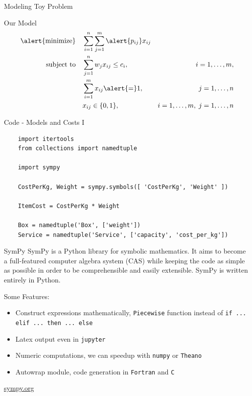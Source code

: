 \documentclass[10pt,utf8,presentation]{beamer}
\begin{document}
\begin{frame}{Modeling Toy Problem}

\begin{block}{Our Model}
  \begin{equation*}
    \begin{aligned}
      \text{\alert{minimize}} & \quad \sum_{i=1}^{n} \sum_{j=1}^{m} \alert{p_{ij}} x_{ij} \\
      \text{subject to} & \quad \sum_{j=1}^{n} w_j x_{ij} \leq c_i, & i=1, \ldots, m, \\
      & \quad \sum_{i=1}^{m} x_{ij} \alert{=} 1, & j = 1, \ldots, n \\
      & \quad x_{ij} \in \{0,1\}, & i=1, \ldots, m, \; j = 1, \ldots, n
    \end{aligned}
    \end{equation*}
\end{block}
  
\end{frame}


\begin{frame}[fragile]{Code - Models and Costs I}
  \scriptsize
  \begin{verbatim}
    import itertools
    from collections import namedtuple
  
    import sympy
  
    CostPerKg, Weight = sympy.symbols([ 'CostPerKg', 'Weight' ])

    ItemCost = CostPerKg * Weight
   
    Box = namedtuple('Box', ['weight'])
    Service = namedtuple('Service', ['capacity', 'cost_per_kg'])

  \end{verbatim}

\end{frame}


\begin{frame}{SymPy}
 \alert{SymPy} is a Python library for symbolic mathematics. 
 It aims to become a full-featured computer algebra system (CAS)
 while keeping the code as simple as possible in order to be comprehensible and easily extensible. 
 SymPy is written entirely in Python.
 
 Some Features:
       \begin{itemize}
        \item Construct expressions mathematically, \alert{\texttt{Piecewise}} function instead of \texttt{if ... elif ... then ... else}
	\item Latex output even in \alert{\texttt{jupyter}}
        \item Numeric computations, we can speedup with \alert{\texttt{numpy}} or  \alert{\texttt{Theano}}
        \item Autowrap module, code generation in \alert{\texttt{Fortran}} and \alert{\texttt{C}}
      \end{itemize}
 \begin{center}\url{sympy.org}\end{center}
\end{frame}
\end{document}
